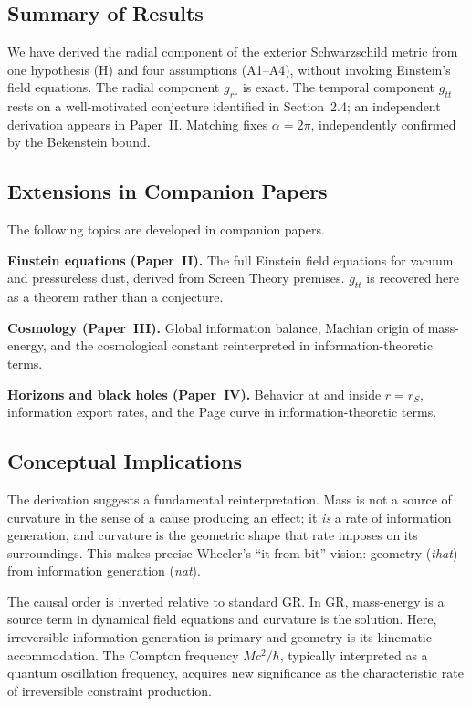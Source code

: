 \documentclass[12pt]{article}
\begin{document}
\subsection{Summary of Results}

We have derived the radial component of the exterior Schwarzschild
metric from one hypothesis (H) and four assumptions (A1--A4), without
invoking Einstein's field equations.
The radial component $g_{rr}$ is exact.
The temporal component $g_{tt}$ rests on a well-motivated conjecture
identified in Section~2.4; an independent derivation appears in
Paper~II.
Matching fixes $\alpha = 2\pi$, independently confirmed by the
Bekenstein bound.

\subsection{Extensions in Companion Papers}

The following topics are developed in companion papers.

\medskip
\noindent\textbf{Einstein equations (Paper~II).}
The full Einstein field equations for vacuum and pressureless dust,
derived from Screen Theory premises.
$g_{tt}$ is recovered here as a theorem rather than a conjecture.

\medskip
\noindent\textbf{Cosmology (Paper~III).}
Global information balance, Machian origin of mass-energy, and the
cosmological constant reinterpreted in information-theoretic terms.

\medskip
\noindent\textbf{Horizons and black holes (Paper~IV).}
Behavior at and inside $r = r_S$, information export rates, and the
Page curve in information-theoretic terms.

\subsection{Conceptual Implications}
\label{sec:implications}

The derivation suggests a fundamental reinterpretation.
Mass is not a source of curvature in the sense of a cause producing an
effect; it \emph{is} a rate of information generation, and curvature
is the geometric shape that rate imposes on its surroundings.
This makes precise Wheeler's \cite{Wheeler1990} ``it from bit'' vision:
geometry (\emph{that}) from information generation (\emph{nat}).

The causal order is inverted relative to standard GR\@.
In GR, mass-energy is a source term in dynamical field equations and
curvature is the solution.
Here, irreversible information generation is primary and geometry is
its kinematic accommodation.
The Compton frequency $Mc^2/\hbar$, typically interpreted as a quantum
oscillation frequency, acquires new significance as the characteristic
rate of irreversible constraint production.
\end{document}
